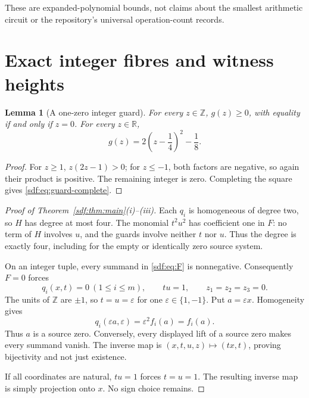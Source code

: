 \documentclass[11pt,a4paper]{article}
\newtheorem{lemma}[theorem]{Lemma}
\theoremstyle{definition}
\theoremstyle{remark}
\newcommand{\Z}{\mathbb Z}
\newcommand{\R}{\mathbb R}
\newcommand{\guard}{g}
\begin{document}
These are expanded-polynomial bounds, not claims about the smallest arithmetic
circuit or the repository's universal operation-count records.

\section{Exact integer fibres and witness heights}\label{sdf:sec:fibres}

\begin{lemma}[A one-zero integer guard]\label{sdf:lem:guard}
For every $z\in\Z$, $\guard(z)\ge0$, with equality if and only if $z=0$.
For every $z\in\R$,
\begin{equation}\label{sdf:eq:guard-complete}
 \guard(z)=2\left(z-\frac14\right)^2-\frac18.
\end{equation}
\end{lemma}
\begin{proof}
For $z\ge1$, $z(2z-1)>0$; for $z\le-1$, both factors are negative, so
again their product is positive. The remaining integer is zero.
Completing the square gives \eqref{sdf:eq:guard-complete}.
\end{proof}

\begin{proof}[Proof of Theorem~\ref{sdf:thm:main}(i)--(iii)]
Each $q_i$ is homogeneous of degree two, so $H$ has degree at most four.
The monomial $t^2u^2$ has coefficient one in $F$: no term of $H$ involves
$u$, and the guards involve neither $t$ nor $u$. Thus the degree is exactly
four, including for the empty or identically zero source system.

On an integer tuple, every summand in \eqref{sdf:eq:F} is nonnegative.
Consequently $F=0$ forces
\[
 q_i(x,t)=0\ (1\le i\le m),\qquad tu=1,\qquad z_1=z_2=z_3=0.
\]
The units of $\Z$ are $\pm1$, so $t=u=\varepsilon$ for one
$\varepsilon\in\{1,-1\}$. Put $a=\varepsilon x$. Homogeneity gives
\[
 q_i(\varepsilon a,\varepsilon)=\varepsilon^2 f_i(a)=f_i(a).
\]
Thus $a$ is a source zero. Conversely, every displayed lift of a source
zero makes every summand vanish. The inverse map is
$(x,t,u,z)\mapsto(tx,t)$, proving bijectivity and not just existence.

If all coordinates are natural, $tu=1$ forces $t=u=1$. The resulting
inverse map is simply projection onto $x$. No sign choice remains.
\end{proof}
\end{document}
